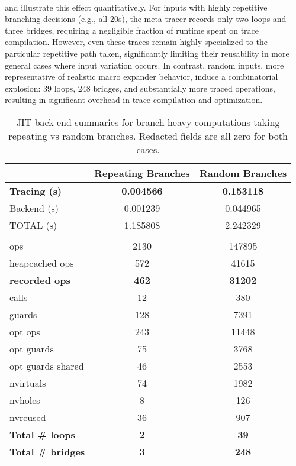 			\paragraph{}%
				 and  illustrate this effect quantitatively. For inputs with highly repetitive branching decisions (e.g., all 20s), the meta-tracer records only two loops and three bridges, requiring a negligible fraction of runtime spent on trace compilation. However, even these traces remain highly specialized to the particular repetitive path taken, significantly limiting their reusability in more general cases where input variation occurs. In contrast, random inputs, more representative of realistic macro expander behavior, induce a combinatorial explosion: 39 loops, 248 bridges, and substantially more traced operations, resulting in significant overhead in trace compilation and optimization.

			\begin{table}[!h]
			\centering
			\small
			\begin{tabular}{@{}lcc@{}}
				\toprule
				& \textbf{Repeating Branches} & \textbf{Random Branches} \\
				\midrule
				\textbf{Tracing (s)}                 & \textbf{0.004566} & \textbf{0.153118} \\
				Backend (s)                 & 0.001239 & 0.044965 \\
				TOTAL (s)                            & 1.185808 & 2.242329 \\ \\
				ops                                   & 2130 & 147895 \\
				heapcached ops                        & 572 & 41615 \\
				\textbf{recorded ops}                & \textbf{462} & \textbf{31202} \\
				\quad calls                                 & 12 & 380 \\
				guards                                & 128 & 7391 \\
				opt ops                               & 243 & 11448 \\
				opt guards                            & 75 & 3768 \\
				opt guards shared                     & 46 & 2553 \\
				nvirtuals                    & 74 & 1982 \\
				nvholes                               & 8 & 126 \\
				nvreused                              & 36 & 907 \\
				\textbf{Total \# loops}               & \textbf{2} & \textbf{39} \\
				\textbf{Total \# bridges}             & \textbf{3} & \textbf{248} \\
				\bottomrule
			\end{tabular}
			\caption{JIT back-end summaries for branch-heavy computations taking repeating vs random branches. Redacted fields are all zero for both cases.}
			\label{table:branchy-backend-summaries}
			\end{table}


